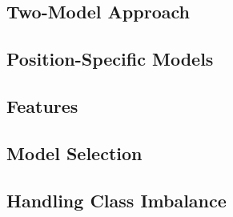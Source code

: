 \documentclass[11pt]{article}
\begin{document}
\subsection{Two-Model Approach}


\subsection{Position-Specific Models}


\subsection{Features}


\subsection{Model Selection}


\subsection{Handling Class Imbalance}

\end{document}
